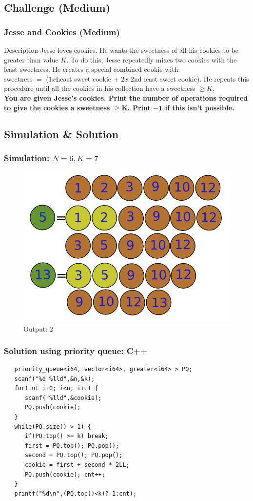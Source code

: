 \documentclass{beamer}
\begin{document}
\subsection{Challenge (Medium)}
\begin{frame}
\frametitle{Jesse and Cookies (Medium)}

\begin{block}{Description}
Jesse loves cookies. He wants the sweetness of all his cookies to be greater than value $K$. To do this, Jesse repeatedly mixes two cookies with the least sweetness. He creates a special combined cookie with:\\
\center sweetness  $=$ ($1x$Least sweet cookie $+$  $2x$ 2nd least sweet cookie).\justify
He repeats this procedure until all the cookies in his collection have a sweetness $\ge K$.\\
\textbf{You are given Jesse's cookies. Print the number of operations required to give the cookies a sweetness $\mathbf{\ge K}$. Print $\mathbf{-1}$ if this isn't possible.} 
\end{block}

\end{frame}
\subsection{Simulation \& Solution}
\begin{frame}
\frametitle{ Simulation: $N=6, K=7$ }
\begin{figure}
	\includegraphics[width=0.5\linewidth]{cookie.png}
	\caption{Output: 2}
\end{figure}
\end{frame}
\begin{frame}[fragile]
\frametitle{ Solution using priority queue: C++ }
\begin{example}[ C++ Implementation ]
\begin{lstlisting}
   priority_queue<i64, vector<i64>, greater<i64> > PQ;
   scanf("%d %lld",&n,&k);
   for(int i=0; i<n; i++) {
      scanf("%lld",&cookie);
      PQ.push(cookie);
   }
   while(PQ.size() > 1) {
      if(PQ.top() >= k) break;
      first = PQ.top(); PQ.pop();
      second = PQ.top(); PQ.pop();
      cookie = first + second * 2LL;
      PQ.push(cookie); cnt++;
   }
   printf("%d\n",(PQ.top()<k)?-1:cnt);
\end{lstlisting}
\end{example}
\end{frame}
\end{document}
